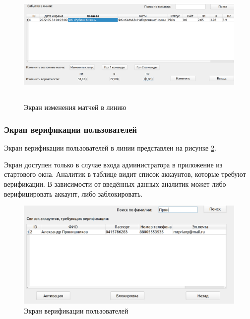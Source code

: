 \FloatBarrier
\begin{figure}[h]	
	\begin{center}
		\includegraphics[height=6cm, width=\linewidth]{inc/matches.png}
	\end{center}
	\captionsetup{justification=centering, labelsep=defffis}
	\caption{Экран изменения матчей в линию}
	\label{fig::change}
\end{figure}
\FloatBarrier

\subsubsection{Экран верификации пользователей}
Экран верификации пользователей в линии представлен на рисунке \ref{fig::verify}.

Экран доступен только в случае входа администратора в приложение из стартового окна.
Аналитик в таблице видит список аккаунтов, которые требуют верификации.
В зависимости от введённых данных аналитик может либо верифицировать аккаунт, либо заблокировать.

\FloatBarrier
\begin{figure}[h]	
	\begin{center}
		\includegraphics[width=\linewidth]{inc/verify.png}
	\end{center}
	\captionsetup{justification=centering, labelsep=defffis}
	\caption{Экран верификации пользователей}
	\label{fig::verify}
\end{figure}
\FloatBarrier